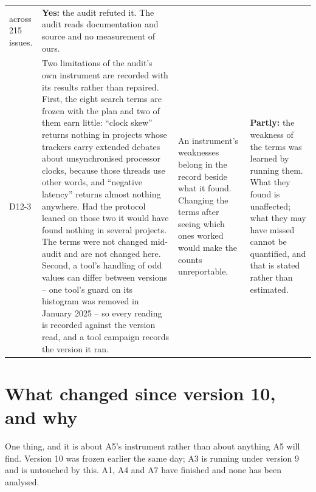 \documentclass[11pt]{article}
\begin{document}
{\begin{longtable}{@{}p{1.1cm} >{\raggedright\arraybackslash}p{6.1cm} >{\raggedright\arraybackslash}p{6.0cm} >{\raggedright\arraybackslash}p{2.2cm}@{}}
across 215 issues. & \textbf{Yes:} the audit refuted it. The audit reads documentation and source
and no measurement of ours. \\
D12-3 & Two limitations of the audit's own instrument are recorded with its results rather than
repaired. First, the eight search terms are frozen with the plan and two of them earn little:
``clock skew'' returns nothing in projects whose trackers carry extended debates about
unsynchronised processor clocks, because those threads use other words, and ``negative latency''
returns almost nothing anywhere. Had the protocol leaned on those two it would have found nothing
in several projects. The terms were not changed mid-audit and are not changed here. Second, a
tool's handling of odd values can differ between versions -- one tool's guard on its histogram was
removed in January 2025 -- so every reading is recorded against the version read, and a tool
campaign records the version it ran. & An instrument's weaknesses belong in the record beside what
it found. Changing the terms after seeing which ones worked would make the counts unreportable.
& \textbf{Partly:} the weakness of the terms was learned by running them. What they found is
unaffected; what they may have missed cannot be quantified, and that is stated rather than
estimated. \\
\bottomrule
\end{longtable}}

\section*{What changed since version 10, and why}
One thing, and it is about A5's instrument rather than about anything A5 will find. Version 10 was
frozen earlier the same day; A3 is running under version 9 and is untouched by this. A1, A4 and A7
have finished and none has been analysed.
\end{document}
